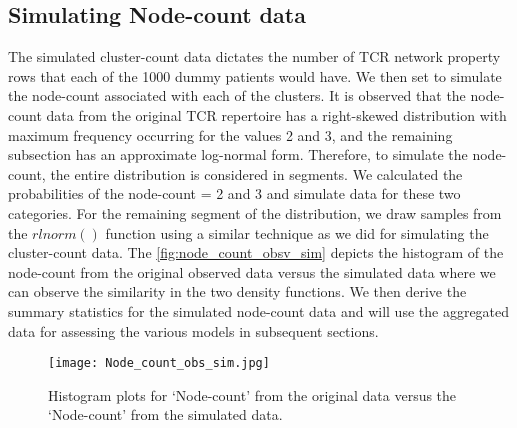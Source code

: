 \subsection{Simulating Node-count data}\label{subsubsec:sim_node_cnt}
The simulated cluster-count data dictates the number of TCR network property rows that each of the 1000 dummy patients would have. We then set to simulate the node-count associated with each of the clusters. It is observed that the node-count data from the original TCR repertoire has a right-skewed distribution with maximum frequency occurring for the values 2 and 3, and the remaining subsection has an approximate log-normal form. Therefore, to simulate the node-count, the entire distribution is considered in segments. We calculated the probabilities of the node-count = 2 and 3 and simulate data for these two categories. For the remaining segment of the distribution, we draw samples from the $rlnorm()$ function using a similar technique as we did for simulating the cluster-count data. The \autoref{fig:node_count_obsv_sim} depicts the histogram of the node-count from the original observed data versus the simulated data where we can observe the similarity in the two density functions. We then derive the summary statistics for the simulated node-count data and will use the aggregated data for assessing the various models in subsequent sections.\par
\begin{figure}[H]
\centering
\texttt{[image: Node\_count\_obs\_sim.jpg]}
\caption{Histogram plots for \lq Node-count' from the original data versus the \lq Node-count' from the simulated data.}
\label{fig:node_count_obsv_sim}
\end{figure}

